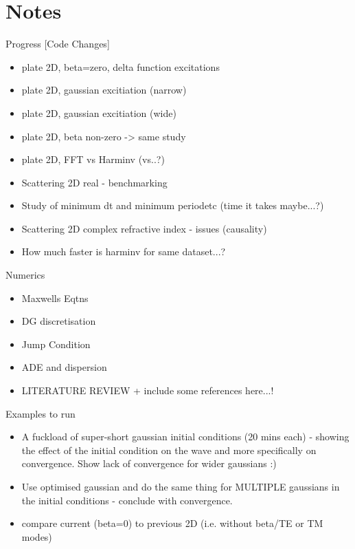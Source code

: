 
\chapter{Notes} %
\label{Appendix.2D_Plate_notes}

Progress [Code Changes]
\begin{itemize}
\item plate 2D, beta=zero, delta function excitations
\item plate 2D, gaussian excitiation (narrow)
\item plate 2D, gaussian excitiation (wide)
\item plate 2D, beta non-zero -> same study
\item plate 2D, FFT vs Harminv (vs..?)
\item Scattering 2D real - benchmarking
\item Study of minimum dt and minimum periodetc (time it takes maybe...?)
\item Scattering 2D complex refractive index - issues (causality)
\item How much faster is harminv for same dataset...?
\end{itemize}

Numerics
\begin{itemize}
\item Maxwells Eqtns
\item DG discretisation
\item Jump Condition
\item ADE and dispersion
\item LITERATURE REVIEW  + include some references here...!
\end{itemize}

Examples to run
\begin{itemize}
\item A fuckload of super-short gaussian initial conditions (20 mins each) - showing the effect of the initial condition on the wave and more specifically on convergence. Show lack of convergence for wider gaussians :)
\item Use optimised gaussian and do the same thing for MULTIPLE gaussians in the initial conditions - conclude with convergence.
\item compare current (beta=0) to previous 2D (i.e. without beta/TE or TM modes)
\end{itemize}

